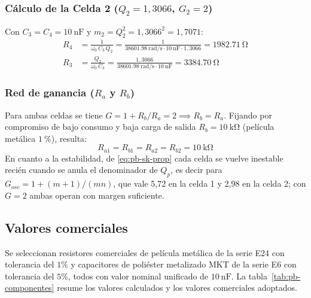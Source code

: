 \subsubsection{Cálculo de la Celda 2 ($Q_2 = 1{,}3066$, $G_2 = 2$)}
Con $C_3 = C_4 = \SI{10}{\nano\farad}$ y $m_2 = Q_2^2 = 1{,}3066^2 = 1{,}7071$:
\begin{align}
  R_4 &= \frac{1}{\omega_0\,C_3\,Q_2} = \frac{1}{\SI{38601.98}{\radian/\second} \cdot \SI{10}{\nano\farad} \cdot 1{,}3066} = \SI{1982.71}{\ohm} \\
  R_3 &= \frac{Q_2}{\omega_0\,C_3} = \frac{1{,}3066}{\SI{38601.98}{\radian/\second} \cdot \SI{10}{\nano\farad}} = \SI{3384.70}{\ohm}
\end{align}

\subsubsection{Red de ganancia ($R_a$ y $R_b$)}

Para ambas celdas se tiene $G = 1 + R_b / R_a = 2 \implies R_b = R_a$. Fijando por compromiso de bajo consumo y baja
carga de salida $R_b = \SI{10}{\kilo\ohm}$ (película metálica $\SI{1}{\percent}$), resulta:
\begin{equation}
  R_{a1} = R_{b1} = R_{a2} = R_{b2} = \SI{10}{\kilo\ohm}
\end{equation}
En cuanto a la estabilidad, de \eqref{eq:pb-sk-prop} cada celda se vuelve inestable recién cuando se anula el
denominador de $Q_p$, es decir para $G_{osc} = 1 + (m + 1)/(m n)$, que vale 5,72 en la celda 1 y 2,98 en la celda 2;
con $G = 2$ ambas operan con margen suficiente.

\subsection{Valores comerciales}
\label{subsec:pb-comerciales}

Se seleccionan resistores comerciales de película metálica de la serie E24 con tolerancia del $1\%$ y capacitores de poliéster metalizado MKT de la serie E6 con tolerancia del $5\%$, todos con valor nominal unificado de $\SI{10}{\nano\farad}$. La tabla~\ref{tab:pb-componentes} resume los valores calculados y los valores comerciales adoptados.

